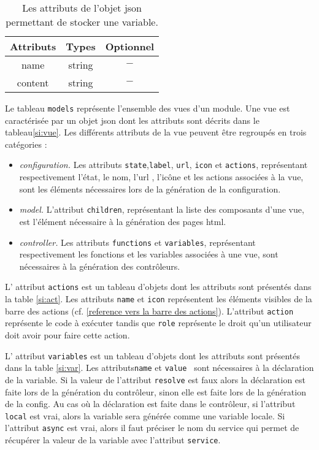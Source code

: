 \documentclass[a4paper,11pt]{report}
\begin{document}
\begin{table}[ht]
 \begin{tabular}{|c|c|c|}
   \hline
   Attributs & Types & Optionnel \\
   \hline
   name &  string & $-$\\
   \hline
   content  & string &  $-$ \\
    \hline
  \end{tabular}
 \caption{Les attributs de l'objet  json permettant de stocker une variable. \label{si:fun} }
\end{table} 

Le tableau {\tt models} représente l'ensemble des vues d'un module. Une vue est 
caractérisée par un objet json dont les attributs sont décrits dans le  tableau\ref{si:vue}.
Les différents attributs de la vue peuvent être regroupés en trois catégories : 

\begin{itemize}
  \item {\em configuration.}
 Les attributs {\tt state},{\tt label}, {\tt url}, {\tt icon} et {\tt actions}, représentant respectivement
 l'état, le nom, l'url , l'icône et les actions associées à la vue, sont les éléments nécessaires lors de la génération
  de la configuration.
 \item {\em model.} 
 L'attribut {\tt children}, représentant la liste des composants d'une vue, est l'élément nécessaire à la génération des pages html. 
 \item {\em controller.}
 Les attributs {\tt functions} et {\tt variables}, représentant respectivement les fonctions et les variables associées
 à une vue, sont nécessaires à la génération des contrôleurs.
\end{itemize}


L' attribut  {\tt actions} est un tableau d'objets dont les attributs sont présentés dans la table \ref{si:act}.
Les attributs {\tt name} et {\tt icon} représentent les éléments visibles de la barre  des actions (cf. \ref{reference vers la barre des actions}).
L'attribut {\tt action } représente le code à exécuter tandis que {\tt role} représente le droit qu'un utilisateur doit avoir pour faire cette action.

L' attribut  {\tt variables} est un tableau d'objets dont les attributs sont présentés dans la table \ref{si:var}.
Les attributs{\tt name} et {\tt value } sont nécessaires à la déclaration de la variable. Si la valeur de l'attribut {\tt resolve} est faux 
alors la déclaration est faite lors de la génération du contrôleur, sinon elle est faite lors de la génération de la config. Au cas où la 
déclaration est faite dans le contrôleur, si l'attribut {\tt local} est vrai, alors la variable sera générée comme une variable locale. Si
l'attribut {\tt async} est vrai, alors il faut préciser le nom du service qui permet de récupérer la valeur de la variable avec l'attribut 
{\tt service}.
\end{document}
